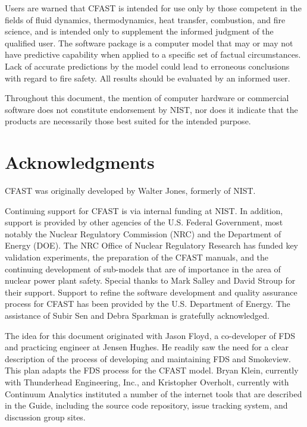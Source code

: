 \documentclass[12pt]{book}
\begin{document}
Users are warned that CFAST is intended for use only by those competent in the fields of fluid dynamics, thermodynamics, heat transfer, combustion, and fire science, and is intended only to supplement the informed judgment of the qualified user. The software package is a computer model that may or may not have predictive capability when applied to a specific set of factual circumstances. Lack of accurate predictions by the model could lead to erroneous conclusions with regard to fire safety. All results should be evaluated by an informed user.

Throughout this document, the mention of computer hardware or commercial software does not constitute endorsement by NIST, nor does it indicate that the products are necessarily those best suited for the intended purpose.



\chapter{Acknowledgments}

\label{acksection}

CFAST was originally developed by Walter Jones, formerly of NIST.

Continuing support for CFAST is via internal funding at NIST. In addition, support is provided by other agencies of the U.S. Federal Government, most notably the Nuclear Regulatory Commission (NRC) and the Department of Energy (DOE). The NRC Office of Nuclear Regulatory Research has funded key validation experiments, the preparation of the CFAST manuals, and the continuing development of sub-models that are of importance in the area of nuclear power plant safety. Special thanks to Mark Salley and David Stroup for their support. Support to refine the software development and quality assurance process for CFAST has been provided by the U.S. Department of Energy. The assistance of Subir Sen and Debra Sparkman is gratefully acknowledged.

The idea for this document originated with Jason Floyd, a co-developer of FDS and practicing engineer at Jensen Hughes. He readily saw the need for a clear description of the process of developing and maintaining FDS and Smokeview. This plan adapts the FDS process for the CFAST model.  Bryan Klein, currently with Thunderhead Engineering, Inc., and Kristopher Overholt, currently with Continuum Analytics instituted a number of the internet tools that are described in the Guide, including the source code repository, issue tracking system, and discussion group sites.
\end{document}
